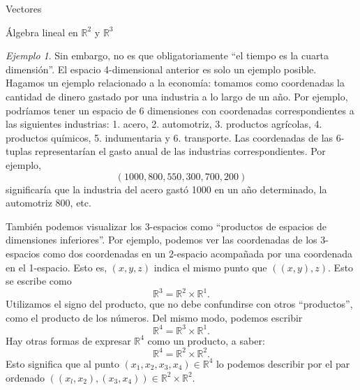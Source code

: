 \documentclass[a4paper,12pt,twoside,spanish,reqno]{amsbook}
\numberwithin{equation}{section}
\theoremstyle{definition}
\theoremstyle{remark}
\newtheorem*{ejemplo*}{Ejemplo}
\newcommand{\R}{\mathbb R}
\begin{document}
\begin{chapter}{Vectores}
\begin{section}{Álgebra lineal en $\R^2$ y $\R^3$}
\begin{ejemplo*}
            Sin embargo, no es que obligatoriamente ``el tiempo es la cuarta dimensión''. El espacio 4-dimensional anterior es solo un ejemplo posible. Hagamos un ejemplo relacionado a la economía: tomamos como coordenadas la cantidad de dinero gastado por una industria a lo largo de un año. 
            Por ejemplo, podríamos tener un espacio de 6 dimensiones con coordenadas correspondientes a las siguientes industrias: 1. acero, 2. automotriz, 3. productos agrícolas,  4. productos químicos, 5. indumentaria y 6. transporte. Las coordenadas de las 6-tuplas representarían el gasto anual de las industrias correspondientes. Por  ejemplo, 
            \begin{equation*}
            (1000, 800, 550, 300, 700, 200)
            \end{equation*}
            significaría que la industria del acero gastó 1000 en un año determinado, la automotriz 800, etc.
        \end{ejemplo*} 

        También podemos visualizar los 3-espacios  como ``productos de espacios de dimensiones inferiores''. Por ejemplo, podemos ver las coordenadas de los 3-espacios como dos coordenadas en un 2-espacio acompañada por una coordenada en el 1-espacio. Esto es, $(x,y,z)$ indica el mismo punto que $((x,y),z)$.  Esto se escribe como 
        \begin{equation*}
            \R^3 = \R^2 \times \R^1.
        \end{equation*}
        Utilizamos el signo del producto, que no debe confundirse con otros ``productos'', como el producto de los números. Del mismo modo, podemos escribir
        \begin{equation*}
        \R^4 = \R^3 \times \R^1.
        \end{equation*}
        Hay otras formas de expresar $\R^4$ como un producto, a saber:
        \begin{equation*}
        \R^4 = \R^2 \times \R^2.
        \end{equation*}
        Esto significa que al punto $(x_1,x_2,x_3,x_4)\in \R^4$  lo podemos describir por el par ordenado $((x_l, x_2),(x_3, x_4))\in \R^2 \times \R^2$. 
        

\end{section}
\end{chapter}
\end{document}
